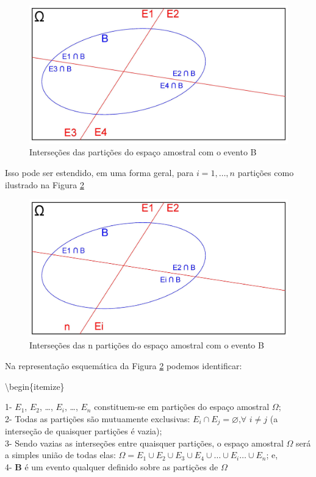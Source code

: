 \documentclass[
]{book}
\begin{document}
\begin{figure}

{\centering \includegraphics[width=0.8\linewidth]{images4/bayes_4} 

}

\caption{Interseções das partições do espaço amostral com o evento B}\label{fig:fig9}
\end{figure}

\hfill\break

Isso pode ser estendido, em uma forma geral, para \(i=1, \dots, n\) partições como ilustrado na Figura \ref{fig:fig10}

\hfill\break

\begin{figure}

{\centering \includegraphics[width=0.8\linewidth]{images4/bayes_5} 

}

\caption{Interseções das n partições do espaço amostral com o evento B}\label{fig:fig10}
\end{figure}

\hfill\break

Na representação esquemática da Figura \ref{fig:fig10} podemos identificar:

\textbackslash begin\{itemize\}

1- \(E_{1}\), \(E_{2}\), \dots , \(E_{i}\), \dots, \(E_{n}\) constituem-se em partições do espaço amostral \(\Omega\);\\
2- Todas as partições são mutuamente exclusivas: \(E_{i} \cap E_{j} = \varnothing\),\(\forall\) \(i \neq j\) (a interseção de quaisquer partições é vazia);\\
3- Sendo vazias as interseções entre quaisquer partições, o espaço amostral \(\Omega\) será a simples união de todas elas: \(\Omega = E_{1} \cup E_{2} \cup E_{3} \cup E_{4}\cup \dots \cup E_{i} \dots \cup E_{n}\); e,\\
4- \textbf{B} é um evento qualquer definido sobre as partições de \(\Omega\)
\end{document}

